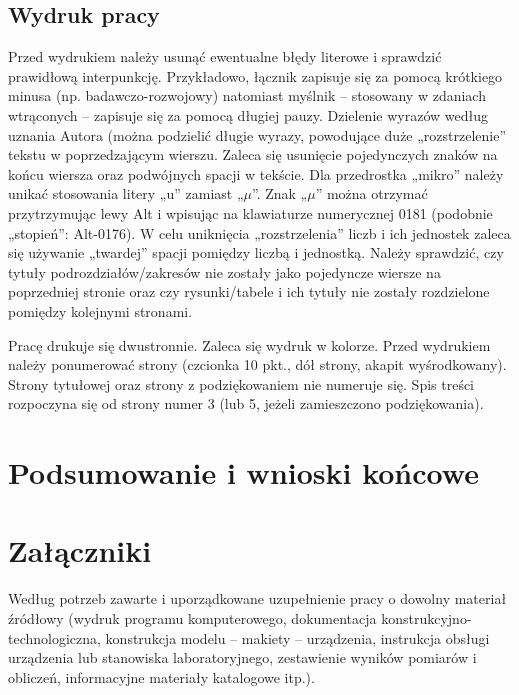 \documentclass[12pt,twoside]{article}
\begin{document}
{\subsection{Wydruk pracy}}

Przed wydrukiem należy usunąć ewentualne błędy literowe i sprawdzić prawidłową
interpunkcję. Przykładowo, łącznik zapisuje się za pomocą krótkiego minusa (np.
badawczo-rozwojowy) natomiast myślnik -- stosowany w zdaniach wtrąconych -- zapisuje
się za pomocą długiej pauzy. Dzielenie wyrazów według uznania Autora (można podzielić
długie wyrazy, powodujące duże „rozstrzelenie” tekstu w poprzedzającym wierszu. Zaleca się usunięcie pojedynczych znaków na końcu wiersza oraz podwójnych spacji w tekście.
Dla przedrostka „mikro” należy unikać stosowania litery „u” zamiast „$\mu$”. Znak „$\mu$” można
otrzymać przytrzymując lewy Alt i wpisując na klawiaturze numerycznej 0181 (podobnie
„stopień”: Alt-0176). W celu uniknięcia „rozstrzelenia” liczb i ich jednostek zaleca się
używanie „twardej” spacji pomiędzy liczbą i jednostką. Należy sprawdzić, czy tytuły
podrozdziałów/zakresów nie zostały jako pojedyncze wiersze na poprzedniej stronie oraz
czy rysunki/tabele i ich tytuły nie zostały rozdzielone pomiędzy kolejnymi stronami.

Pracę drukuje się dwustronnie. Zaleca się wydruk w kolorze. Przed wydrukiem
należy ponumerować strony (czcionka 10 pkt., dół strony, akapit wyśrodkowany). Strony
tytułowej oraz strony z podziękowaniem nie numeruje się. Spis treści rozpoczyna się od
strony numer 3 (lub 5, jeżeli zamieszczono podziękowania).

\clearpage

\section{Podsumowanie i wnioski końcowe}


\clearpage

\section*{Załączniki}

Według potrzeb zawarte i uporządkowane uzupełnienie pracy o dowolny materiał źródłowy (wydruk programu komputerowego, dokumentacja kons\-truk\-cyj\-no-\-tech\-no\-lo\-gicz\-na, konstrukcja modelu -- makiety -- urządzenia, instrukcja obsługi urządzenia lub stanowiska laboratoryjnego, zestawienie wyników pomiarów i obliczeń, informacyjne materiały katalogowe itp.).
\end{document}
